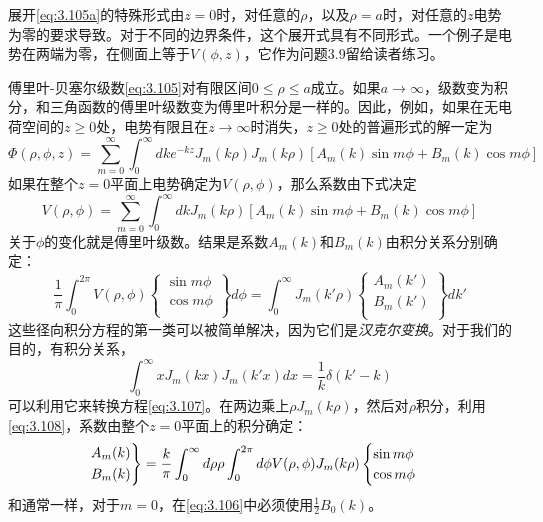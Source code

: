 \documentclass[12pt]{book}
\numberwithin{equation}{chapter}
\numberwithin{figure}{chapter}
\numberwithin{footnote}{page}
\begin{document}
展开\autoref{eq:3.105a}的特殊形式由$z=0$时，对任意的$\rho$，以及$\rho=a$时，对任意的$z$电势为零的要求导致。对于不同的边界条件，这个展开式具有不同形式。一个例子是电势在两端为零，在侧面上等于$V(\phi,z)$，它作为问题3.9留给读者练习。

傅里叶-贝塞尔级数\autoref{eq:3.105}对有限区间$0\leq \rho\leq a$成立。如果$a\to\infty$，级数变为积分，和三角函数的傅里叶级数变为傅里叶积分是一样的。因此，例如，如果在无电荷空间的$z\geq 0$处，电势有限且在$z\to\infty$时消失，$z\geq0$处的普遍形式的解一定为
\begin{equation}\label{eq:3.106}
    \Phi(\rho,\phi,z)=\sum_{m=0}^\infty\int_0^\infty dk e^{-kz}J_m(k\rho)J_m(k\rho)[A_m(k)\sin m\phi+B_m(k)\cos m\phi]
\end{equation}
如果在整个$z=0$平面上电势确定为$V(\rho,\phi)$，那么系数由下式决定
$$V(\rho,\phi)=\sum_{m=0}^\infty\int_0^\infty dk J_m(k\rho)[A_m(k)\sin m\phi+B_m(k)\cos m\phi]$$
关于$\phi$的变化就是傅里叶级数。结果是系数$A_m(k)$和$B_m(k)$由积分关系分别确定：
\begin{equation}\label{eq:3.107}
    \frac{1}{\pi}\int_0^{2\pi} V(\rho,\phi)\left\{
        \begin{aligned}
            \sin m\phi\\
            \cos m\phi\\
        \end{aligned}\right\}
        d\phi=\int_0^\infty J_m(k'\rho)\left\{
        \begin{aligned}
            A_m(k')\\
            B_m(k')\\
        \end{aligned}\right\}
        dk'
\end{equation}
这些径向积分方程的第一类可以被简单解决，因为它们是\textit{汉克尔变换}。对于我们的目的，有积分关系，
\begin{equation}\label{eq:3.108}
    \int_0^\infty x J_m(kx)J_m(k'x)dx=\frac{1}{k}\delta(k'-k)
\end{equation}
可以利用它来转换方程\autoref{eq:3.107}。在两边乘上$\rho J_m(k\rho)$，然后对$\rho$积分，利用\autoref{eq:3.108}，系数由整个$z=0$平面上的积分确定：
\begin{equation}\label{eq:3.109}
    \begin{rcases*}
        A_m(k)\\
        B_m(k)\\
    \end{rcases*}
    =\frac{k}{\pi}\int_0^\infty d\rho \rho \int_0^{2\pi} d\phi V(\rho,\phi)J_m(k\rho)
    \begin{cases}
        \sin m\phi\\
        \cos m\phi\\
    \end{cases}
\end{equation}
和通常一样，对于$m=0$，在\autoref{eq:3.106}中必须使用$\frac{1}{2}B_0(k)$。
\end{document}

